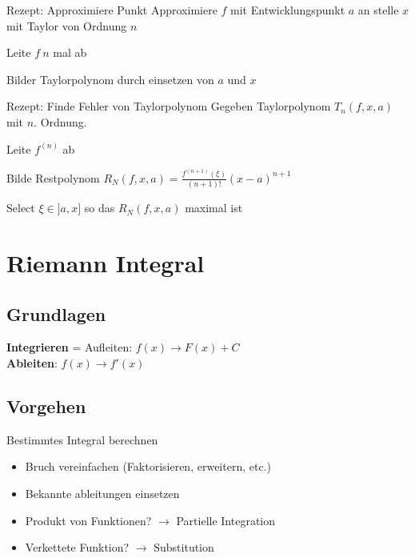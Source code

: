 \documentclass[a4paper]{article}
\begin{document}
\begin{howtobox}{Rezept: Approximiere Punkt}
  Approximiere $f$ mit Entwicklungspunkt $a$ an stelle $x$ mit Taylor von Ordnung $n$
  \begin{compactenum}
      \item Leite $f \ n$ mal ab
      \item Bilder Taylorpolynom durch einsetzen von $a$ und $x$
  \end{compactenum}
\end{howtobox}

\begin{howtobox}{Rezept: Finde Fehler von Taylorpolynom}
  Gegeben Taylorpolynom $T_n(f, x, a)$ mit $n$. Ordnung.
  \begin{compactenum}
      \item Leite $f^{(n)}$ ab
  \item Bilde Restpolynom $R_N(f, x, a) = \frac{f^{(n+1)}(\xi)}{(n + 1)!}(x - a)^{n + 1}$
      \item Select $\xi \in ]a, x]$ so das $R_N(f, x, a)$ maximal ist 
  \end{compactenum}
\end{howtobox}

\section{Riemann Integral}
\subsection{Grundlagen}
\textbf{Integrieren} = Aufleiten: $f(x) \rightarrow F(x) + C$ \\
\textbf{Ableiten}: $f(x) \rightarrow f'(x)$

\subsection{Vorgehen}
\begin{howtobox}{Bestimmtes Integral berechnen}
  \begin{itemize}[leftmargin=3mm, topsep=1pt, parsep=1pt]
    \item[1.] Bruch vereinfachen (Faktorisieren, erweitern, etc.)
    \item[2.] Bekannte ableitungen einsetzen 
    \item[3.] Produkt von Funktionen? $\to$ Partielle Integration 
    \item[4.] Verkettete Funktion? $\to$ Substitution 
  \end{itemize}
\end{howtobox}
\end{document}
